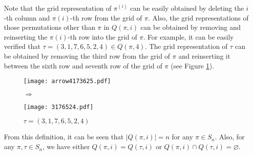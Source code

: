 Note that the grid representation of $\pi^{(i)}$ can be easily obtained by deleting the $i$-th column and $\pi(i)$-th row from the grid of $\pi$. Also, the grid representations of those permutations other than $\pi$ in $Q(\pi, i)$ can be obtained by removing and reinserting the $\pi(i)$-th row into the grid of $\pi$. For example, it can be easily verified that $\tau = (3,1,7,6,5,2,4) \in Q(\pi, 4)$. The grid representation of $\tau$ can be obtained by removing the third row from the grid of $\pi$ and reinserting it between the sixth row and seventh row of the grid of $\pi$ (see Figure \ref{fg:2}).
\begin{figure}[h]
\hfill
\begin{minipage}[b]{0.4\textwidth} \centering
\texttt{[image: arrow4173625.pdf]}
\caption*{\small$\pi = (4,1,7,3,6,2,5)$}
\end{minipage}
\begin{minipage}[t]{0.1\textwidth} \centering
\vspace{-2.3cm}
$\Longrightarrow$
\vspace{2cm}
\caption{}\label{fg:2}
\end{minipage}
\begin{minipage}[b]{0.4\textwidth} \centering
\texttt{[image: 3176524.pdf]}
\caption*{\small$\tau = (3,1,7,6,5,2,4)$}
\end{minipage}
\hfill
\end{figure}

From this definition, it can be seen that $|Q(\pi, i)| = n$ for any $\pi \in S_n$. Also, for any $\pi, \tau \in S_n$, we have either
$Q(\pi, i) = Q(\tau, i)$ or $Q(\pi, i) \cap Q(\tau, i) = \varnothing$.

